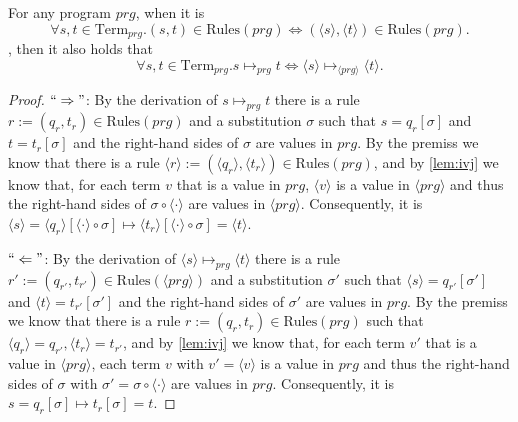 \begin{lemma}
\label{lem:isoc}
For any program $prg$, when it is
\[
\forall s,t \in \textrm{Term}_{prg}. (s, t) \in \textrm{Rules}(prg) \iff (\langle s \rangle, \langle t \rangle) \in \textrm{Rules}(prg).
\]
, then it also holds that
\[
\forall s,t \in \textrm{Term}_{prg}. s \mapsto_{prg} t \iff \langle s \rangle \mapsto_{\langle prg \rangle} \langle t \rangle.
\]
\begin{proof}
$``\Rightarrow"$: By the derivation of $s \mapsto_{prg} t$ there is a rule $r := (q_r, t_r) \in \textrm{Rules}(prg)$ and a substitution $\sigma$ such that $s = q_r[\sigma]$ and $t = t_r[\sigma]$ and the right-hand sides of $\sigma$ are values in $prg$. By the premiss we know that there is a rule $\langle r \rangle := (\langle q_r \rangle, \langle t_r \rangle) \in \textrm{Rules}(prg)$, and by \autoref{lem:ivj} we know that, for each term $v$ that is a value in $prg$, $\langle v \rangle$ is a value in $\langle prg \rangle$ and thus the right-hand sides of $\sigma \circ \langle \cdot \rangle$ are values in $\langle prg \rangle$. Consequently, it is $\langle s \rangle = \langle q_r \rangle[\langle \cdot \rangle \circ \sigma] \mapsto \langle t_r \rangle[\langle \cdot \rangle \circ \sigma] = \langle t \rangle$.

$``\Leftarrow"$: By the derivation of $\langle s \rangle \mapsto_{prg} \langle t \rangle$ there is a rule $r' := (q_{r'}, t_{r'}) \in \textrm{Rules}(\langle prg \rangle)$ and a substitution $\sigma'$ such that $\langle s \rangle = q_{r'}[\sigma']$ and $\langle t \rangle = t_{r'}[\sigma']$ and the right-hand sides of $\sigma'$ are values in $prg$. By the premiss we know that there is a rule $r  := (q_r, t_r) \in \textrm{Rules}(prg)$ such that $\langle q_r \rangle = q_{r'}, \langle t_r \rangle = t_{r'}$, and by \autoref{lem:ivj} we know that, for each term $v'$ that is a value in $\langle prg \rangle$, each term $v$ with $v' = \langle v \rangle$ is a value in $prg$ and thus the right-hand sides of $\sigma$ with $\sigma' = \sigma \circ \langle \cdot \rangle$ are values in $prg$. Consequently, it is $s = q_r[\sigma] \mapsto t_r[\sigma] = t$.
\end{proof}
\end{lemma}

